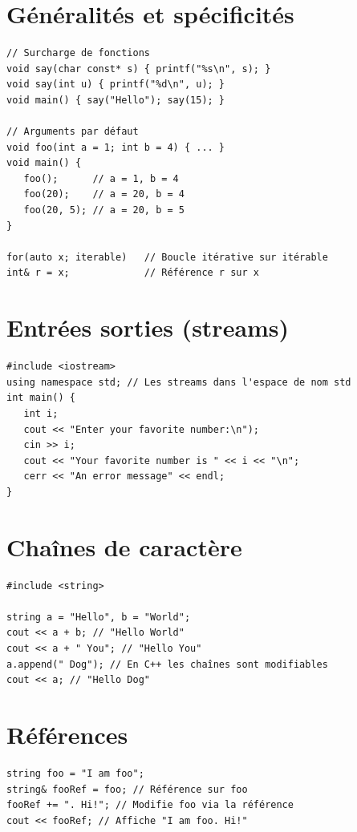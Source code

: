 \documentclass{article}
\begin{document}
\begin{multicols*}{3}
    \section*{Généralités et spécificités}

    \begin{lstlisting}
// Surcharge de fonctions
void say(char const* s) { printf("%s\n", s); }
void say(int u) { printf("%d\n", u); }
void main() { say("Hello"); say(15); }

// Arguments par défaut
void foo(int a = 1; int b = 4) { ... }
void main() {
   foo();      // a = 1, b = 4
   foo(20);    // a = 20, b = 4
   foo(20, 5); // a = 20, b = 5
}

for(auto x; iterable)   // Boucle itérative sur itérable
int& r = x;             // Référence r sur x
\end{lstlisting}

    \section*{Entrées sorties (streams)}

    \begin{lstlisting}
#include <iostream>
using namespace std; // Les streams dans l'espace de nom std
int main() {
   int i;
   cout << "Enter your favorite number:\n");
   cin >> i;
   cout << "Your favorite number is " << i << "\n";
   cerr << "An error message" << endl;
}
\end{lstlisting}

    \section*{Chaînes de caractère}

    \begin{lstlisting}
#include <string>

string a = "Hello", b = "World";
cout << a + b; // "Hello World"
cout << a + " You"; // "Hello You"
a.append(" Dog"); // En C++ les chaînes sont modifiables
cout << a; // "Hello Dog"
\end{lstlisting}

    \section*{Références}

    \begin{lstlisting}
string foo = "I am foo";
string& fooRef = foo; // Référence sur foo
fooRef += ". Hi!"; // Modifie foo via la référence
cout << fooRef; // Affiche "I am foo. Hi!"


\end{lstlisting}
\end{multicols*}
\end{document}
